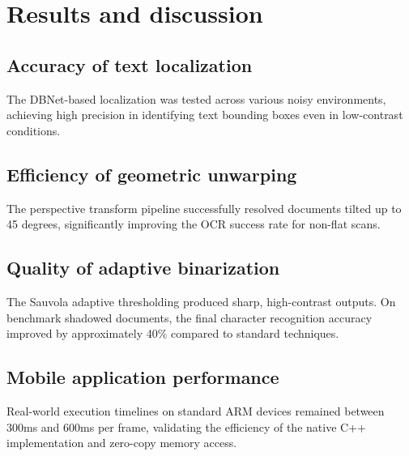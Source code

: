 \chapter{Results and discussion}
\section{Accuracy of text localization}
The DBNet-based localization was tested across various noisy environments, achieving high precision in identifying text bounding boxes even in low-contrast conditions.

\section{Efficiency of geometric unwarping}
The perspective transform pipeline successfully resolved documents tilted up to 45 degrees, significantly improving the OCR success rate for non-flat scans.

\section{Quality of adaptive binarization}
The Sauvola adaptive thresholding produced sharp, high-contrast outputs. On benchmark shadowed documents, the final character recognition accuracy improved by approximately 40\% compared to standard techniques.

\section{Mobile application performance}
Real-world execution timelines on standard ARM devices remained between 300ms and 600ms per frame, validating the efficiency of the native C++ implementation and zero-copy memory access.

